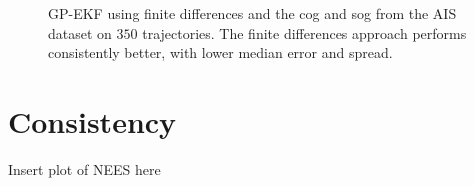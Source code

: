 \begin{figure}[h]
    \centering
    \caption{GP-EKF using finite differences and the \acrshort{cog} and \acrshort{sog} from the AIS dataset on $350$ trajectories. The finite differences approach performs consistently better, with lower median error and spread.}
    \label{fig:stats_curved_gp_ekf_fd_vs_cog}
\end{figure}




\section{Consistency}
Insert plot of NEES here



